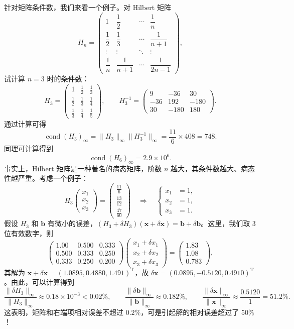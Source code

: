 针对矩阵条件数，我们来看一个例子。对 Hilbert 矩阵
\[
H_n=\begin{pmatrix}
1&\dfrac12&\cdots&\dfrac1n\\
\dfrac12&\dfrac13&\cdots&\dfrac1{n+1}\\
\vdots&\vdots&\ddots&\vdots\\
\dfrac1n&\dfrac1{n+1}&\cdots&\dfrac1{2n-1}
\end{pmatrix},
\]
试计算 $n=3$ 时的条件数：
\[
H_3=\begin{pmatrix}
1&\frac12&\frac13\\
\frac12&\frac13&\frac14\\
\frac13&\frac14&\frac15
\end{pmatrix},\qquad
H_3^{-1}=\begin{pmatrix}
9&-36&30\\
-36&192&-180\\
30&-180&180
\end{pmatrix}.
\]
通过计算可得
\[
\operatorname{cond}(H_3)_\infty=\|H_3\|_\infty\|H_3^{-1}\|_\infty
=\frac{11}{6}\times408=748.
\]
同理可计算得到
\[
\operatorname{cond}(H_6)_\infty=2.9\times10^6.
\]
事实上，Hilbert 矩阵是一种著名的病态矩阵，阶数 $n$ 越大，其条件数越大、病态性越严重。考虑一个例子：
\[
H_3\begin{pmatrix}x_1\\x_2\\x_3\end{pmatrix}
=
\begin{pmatrix}\frac{11}{6}\\\frac{13}{12}\\\frac{47}{60}\end{pmatrix}
\quad\Rightarrow\quad
\left\{\begin{aligned}x_1&=1,\\x_2&=1,\\x_3&=1.\end{aligned}\right.
\]
假设 $H_3$ 和 $\bm b$ 有微小的误差，$(H_3+\delta H_3)(\bm x+\delta\bm x)=\bm b+\delta\bm b$。这里，我们取 3 位有效数字，则
\[
\begin{pmatrix}
1.00&0.500&0.333\\
0.500&0.333&0.250\\
0.333&0.250&0.200
\end{pmatrix}
\begin{pmatrix}x_1+\delta x_1\\x_2+\delta x_2\\x_3+\delta x_3\end{pmatrix}
=
\begin{pmatrix}1.83\\1.08\\0.783\end{pmatrix},
\]
其解为 $\bm x+\delta\bm x=(1.0895,0.4880,1.491)^{\mathrm T}$，故 $\delta\bm x=(0.0895,-0.5120,0.4910)^{\mathrm T}$。由此，可以计算得到
\[
\frac{\|\delta H_3\|_\infty}{\|H_3\|_\infty}\approx0.18\times10^{-3}<0.02\%,\qquad
\frac{\|\delta\bm b\|_\infty}{\|\bm b\|_\infty}\approx0.182\%,\qquad
\frac{\|\delta\bm x\|_\infty}{\|\bm x\|_\infty}\approx\frac{0.5120}{1}=51.2\%.
\]
这表明，矩阵和右端项相对误差不超过 $0.2\%$，可是引起解的相对误差超过了 $50\%$！

